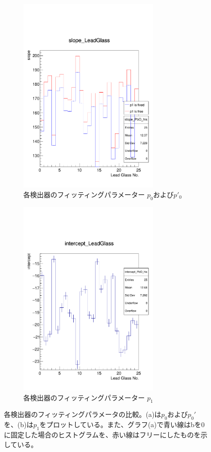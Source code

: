 \begin{figure}[H]
	\begin{subfigure}{.5\textwidth}
		\begin{center}
 		 	\includegraphics[width=200pt]{./Figure/EBESAnalysis/calibration_slope_fix.pdf} 
			  \caption{各検出器のフィッティングパラメーター $p_0$および$p'_0$}
  			\label{fig:sfig1}
 		\end{center}
	\end{subfigure}
	\begin{subfigure}{.5\textwidth}
		\begin{center}
			\includegraphics[width=200pt]{./Figure/EBESAnalysis/calibration_intercept.pdf}%
			\caption{各検出器のフィッティングパラメーター $p_1$}
			\label{fig:sfig2}
		\end{center}
	\end{subfigure}
	\caption[フィッティングパラメーターの比較]{各検出器のフィッティングパラメータの比較。(a)は$p_0$および$p_0'$を、(b)は$p_1$をプロットしている。また、グラフ(a)で青い線はbを0に固定した場合のヒストグラムを、赤い線はフリーにしたものを示している。}
	\label{calib_para}
\end{figure}

